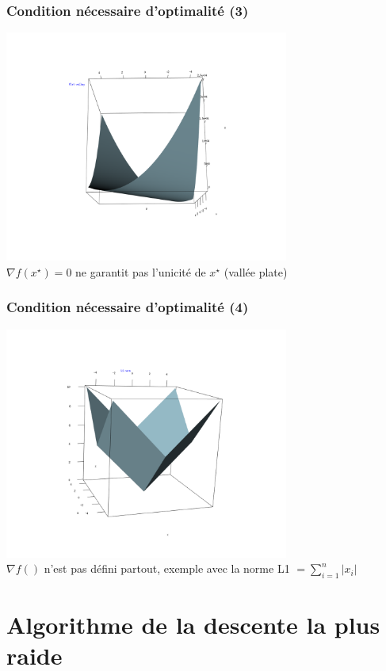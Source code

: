\documentclass[12pt]{beamer}
\begin{document}
\begin{frame}
\begin{itemize}
\begin{frame}
\frametitle{Condition nécessaire d’optimalité (3)} 
\begin{center}
\includegraphics[width=0.7\textwidth]{flat_valley.png} \\
$\nabla f(x^\star) = 0$ ne garantit pas l’unicité de $x^\star$ (vallée plate)
\end{center}
\end{frame}

\begin{frame}
\frametitle{Condition nécessaire d’optimalité (4)} 
\begin{center}
\includegraphics[width=0.7\textwidth]{L1norm.png} \\
$\nabla f()$ n’est pas défini partout, exemple avec la norme L1 $= \sum_{i=1}^n |x_i|$
\end{center}
\end{frame}


\section{Algorithme de la descente la plus raide}


\end{itemize}
\end{frame}
\end{document}
